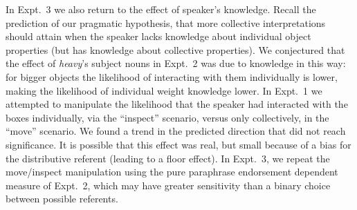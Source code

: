 \documentclass[linguex]{sp}
\begin{document}
In Expt.~3 we also return to the effect of speaker's knowledge. Recall the prediction of our pragmatic hypothesis, that more collective interpretations should attain when the speaker lacks knowledge about individual object properties (but has knowledge about collective properties). We conjectured that the effect of \emph{heavy}'s subject nouns in Expt.~2 was due to knowledge in this way: for bigger objects the likelihood of interacting with them individually is lower, making the likelihood of individual weight knowledge lower.
In Expt.~1 we attempted to manipulate the likelihood that the speaker had interacted with the boxes individually, via the ``inspect'' scenario, versus only collectively, in the ``move'' scenario. We found a trend in the predicted direction that did not reach significance.
It is possible that this effect was real, but small because of a bias for the distributive referent (leading to a floor effect).
In Expt.~3, we repeat the move/inspect manipulation using the pure paraphrase endorsement dependent measure of Expt.~2, which may have greater sensitivity than a binary choice between possible referents.

%
%
%
\end{document}
